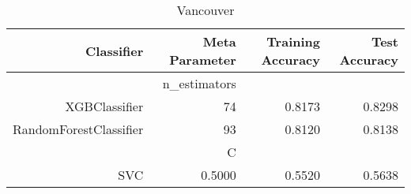 
\begin{table}[H]
    \caption{Vancouver}
    \centering
    \begin{tabular}{|r|r|r|r|}
        \hline
        Classifier &Meta Parameter &Training Accuracy
        &Test Accuracy\\
        \hline
        &n\_estimators &\multicolumn{2}{|r|}{}\\
        \hline
        XGBClassifier &74 &0.8173 &0.8298\\
        \hline
        RandomForestClassifier &93 &0.8120 &0.8138\\
        \hline
        &C &\multicolumn{2}{|r|}{}\\
        \hline
        SVC &0.5000 &0.5520 &0.5638\\
        \hline
    \end{tabular}
\end{table}
